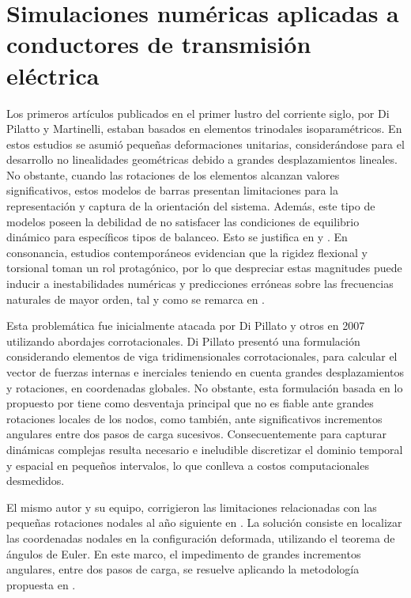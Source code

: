 \section{Simulaciones numéricas aplicadas a conductores de transmisión eléctrica}\label{Sec:EA:AplicadasConductores}
Los primeros artículos publicados en el primer lustro del corriente siglo, por Di Pilatto y Martinelli, estaban basados en elementos trinodales isoparamétricos. En estos estudios se asumió pequeñas deformaciones unitarias, considerándose para el desarrollo no linealidades geométricas debido a grandes desplazamientos lineales. No obstante, cuando las rotaciones de los elementos alcanzan valores significativos, estos modelos de barras presentan limitaciones para la representación y captura de la orientación del sistema. Además, este tipo de modelos poseen la debilidad de no satisfacer las condiciones de equilibrio dinámico para específicos tipos de balanceo. Esto se justifica en \citep{martinelli2001numerical} y \citep{Martinelli2004}. En consonancia, estudios contemporáneos evidencian que la rigidez flexional y torsional toman un rol protagónico, por lo que despreciar estas magnitudes puede inducir a inestabilidades numéricas y predicciones erróneas sobre las frecuencias naturales de mayor orden, tal y como se remarca en \citep{koh2004dynamic}.

Esta problemática fue inicialmente atacada por Di Pillato y otros en 2007 utilizando abordajes corrotacionales. Di Pillato presentó una formulación considerando elementos de viga tridimensionales corrotacionales, para calcular el vector de fuerzas internas e inerciales teniendo en cuenta grandes desplazamientos y rotaciones, en coordenadas globales. No obstante, esta formulación basada en lo propuesto por \cite{oran1973tangent} tiene como desventaja principal que no es fiable ante grandes rotaciones locales de los nodos, como también, ante significativos incrementos angulares entre dos pasos de carga sucesivos. Consecuentemente para capturar dinámicas complejas resulta necesario e ineludible discretizar el dominio temporal y espacial en pequeños intervalos, lo que conlleva a costos computacionales desmedidos.

El mismo autor y su equipo, corrigieron las limitaciones relacionadas con las pequeñas rotaciones nodales al año siguiente en \citep{di2008corotational}. La solución consiste en localizar las coordenadas nodales en la configuración deformada, utilizando el teorema de ángulos de Euler. En este marco, el impedimento de grandes incrementos angulares, entre dos pasos de carga, se resuelve aplicando la metodología propuesta en \citep{simo1988dynamics}.  


